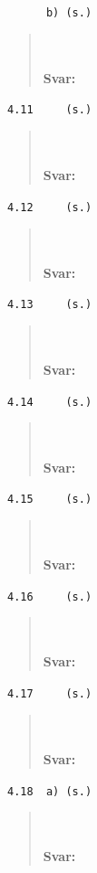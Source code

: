 \documentclass[a4paper]{article}
\newcommand{\tskcol}[1]{\textcolor{tskcol}{#1}}
\begin{document}
\texttt{\tskcol{~~~~~~b) (s.)}}
\begin{quotation}
	\noindent
	\\ \\
	\textbf{Svar:}
\end{quotation}

\texttt{\tskcol{4.11~~~~ (s.)}}
\begin{quotation}
	\noindent
	\\ \\
	\textbf{Svar:}
\end{quotation}

\texttt{\tskcol{4.12~~~~ (s.)}}
\begin{quotation}
	\noindent
	\\ \\
	\textbf{Svar:}
\end{quotation}

\texttt{\tskcol{4.13~~~~ (s.)}}
\begin{quotation}
	\noindent
	\\ \\
	\textbf{Svar:}
\end{quotation}

\texttt{\tskcol{4.14~~~~ (s.)}}
\begin{quotation}
	\noindent
	\\ \\
	\textbf{Svar:}
\end{quotation}

\texttt{\tskcol{4.15~~~~ (s.)}}
\begin{quotation}
	\noindent
	\\ \\
	\textbf{Svar:}
\end{quotation}

\texttt{\tskcol{4.16~~~~ (s.)}}
\begin{quotation}
	\noindent
	\\ \\
	\textbf{Svar:}
\end{quotation}

\texttt{\tskcol{4.17~~~~ (s.)}}
\begin{quotation}
	\noindent
	\\ \\
	\textbf{Svar:}
\end{quotation}

\texttt{\tskcol{4.18~~a) (s.)}}
\begin{quotation}
	\noindent
	\\ \\
	\textbf{Svar:}
\end{quotation}
\end{document}
